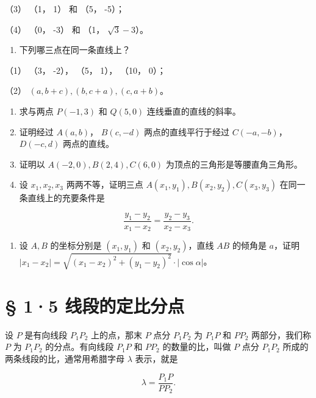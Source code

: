 （3） （1， 1） 和 （5， -5）；

（4） （0， -3） 和 （1， \(\sqrt{3} - 3\)）。

\begin{enumerate}
\def\labelenumi{\arabic{enumi}.}
\setcounter{enumi}{8}
\tightlist
\item
  下列哪三点在同一条直线上？
\end{enumerate}

（1） （3， -2）， （5， 1）， （10， 0）；

（2） \((a, b + c), (b, c + a), (c, a + b)\)。

\begin{enumerate}
\def\labelenumi{\arabic{enumi}.}
\setcounter{enumi}{9}
\item
  求与两点 \(P(-1,3)\) 和 \(Q(5,0)\) 连线垂直的直线的斜率。
\item
  证明经过 \(A(a, b)\)， \(B(c, -d)\) 两点的直线平行于经过
  \(C(-a, -b)\)， \(D(-c, d)\) 两点的直线。
\item
  证明以 \(A(-2,0), B(2,4), C(6,0)\) 为顶点的三角形是等腰直角三角形。
\item
  设 \(x_{1}, x_{2}, x_{3}\) 两两不等，证明三点
  \(A(x_{1}, y_{1}), B(x_{2}, y_{2}), C(x_{3}, y_{3})\)
  在同一条直线上的充要条件是
\end{enumerate}

\[
\frac {y_{1} - y_{2}}{x_{1} - x_{2}} = \frac {y_{2} - y_{3}}{x_{2} - x_{3}}.
\]

\begin{enumerate}
\def\labelenumi{\arabic{enumi}.}
\setcounter{enumi}{13}
\tightlist
\item
  设 \(A, B\) 的坐标分别是 \((x_{1}, y_{1})\) 和
  \((x_{2}, y_{2})\)，直线 \(AB\) 的倾角是 \(a\)，证明
  \(|x_{1} - x_{2}| = \sqrt{(x_{1} - x_{2})^{2} + (y_{1} - y_{2})^{2}} \cdot |\cos \alpha|\)。
\end{enumerate}

\section{§ 1·5
线段的定比分点}\label{ux7ebfux6bb5ux7684ux5b9aux6bd4ux5206ux70b9}

设 \(P\) 是有向线段 \(P_{1}P_{2}\) 上的点，那末 \(P\) 点分
\(P_{1}P_{2}\) 为 \(P_{1}P\) 和 \(PP_{2}\) 两部分，我们称 \(P\) 为
\(P_{1}P_{2}\) 的分点。有向线段 \(P_{1}P\) 和 \(PP_{2}\)
的数量的比，叫做 \(P\) 点分 \(P_{1}P_{2}\)
所成的两条线段的比，通常用希腊字母 \(\lambda\) 表示，就是

\[
\lambda = \frac {P_{1} P}{PP_{2}}.
\]

